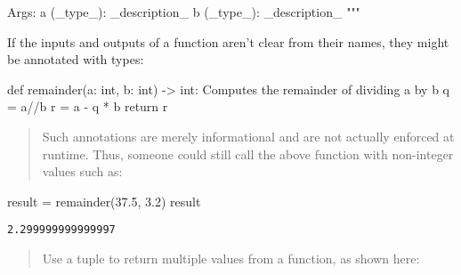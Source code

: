 \documentclass[
  letterpaper,
  DIV=11,
  numbers=noendperiod]{scrreprt}
\newenvironment{Shaded}{\begin{snugshade}}{\end{snugshade}}
\newcommand{\BuiltInTok}[1]{\textcolor[rgb]{0.00,0.46,0.62}{#1}}
\newcommand{\BuiltInTok}[1]{\textcolor[rgb]{0.00,0.48,0.65}{#1}}
\newcommand{\CommentTok}[1]{\textcolor[rgb]{0.37,0.37,0.37}{#1}}
\newcommand{\ControlFlowTok}[1]{\textcolor[rgb]{0.00,0.46,0.62}{#1}}
\newcommand{\ControlFlowTok}[1]{\textcolor[rgb]{0.00,0.48,0.65}{#1}}
\newcommand{\FloatTok}[1]{\textcolor[rgb]{0.68,0.00,0.00}{#1}}
\newcommand{\KeywordTok}[1]{\textcolor[rgb]{0.00,0.46,0.62}{#1}}
\newcommand{\NormalTok}[1]{\textcolor[rgb]{0.00,0.46,0.62}{#1}}
\newcommand{\OperatorTok}[1]{\textcolor[rgb]{0.37,0.37,0.37}{#1}}
\newcommand{\FloatTok}[1]{\textcolor[rgb]{0.68,0.00,0.00}{#1}}
\newcommand{\KeywordTok}[1]{\textcolor[rgb]{0.00,0.48,0.65}{#1}}
\newcommand{\NormalTok}[1]{\textcolor[rgb]{0.00,0.48,0.65}{#1}}
\newcommand{\OperatorTok}[1]{\textcolor[rgb]{0.37,0.37,0.37}{#1}}
\begin{document}
\begin{Shaded}
\begin{Highlighting}[]
\begin{Shaded}
\begin{Highlighting}[]
\CommentTok{    Args:}
\CommentTok{        a (\_type\_): \_description\_}
\CommentTok{        b (\_type\_): \_description\_}
\CommentTok{    """}
\end{Highlighting}
\end{Shaded}

If the inputs and outputs of a function aren't clear from their names,
they might be annotated with types:

\begin{Shaded}
\begin{Highlighting}[]
\KeywordTok{def}\NormalTok{ remainder(a: }\BuiltInTok{int}\NormalTok{, b: }\BuiltInTok{int}\NormalTok{) }\OperatorTok{{-}\textgreater{}} \BuiltInTok{int}\NormalTok{:}
    \CommentTok{\textquotesingle{}\textquotesingle{}\textquotesingle{}  }
\CommentTok{    Computes    the remainder   of  dividing    a   by  b               }
\CommentTok{    \textquotesingle{}\textquotesingle{}\textquotesingle{}}                 
\NormalTok{    q   }\OperatorTok{=}\NormalTok{   a}\OperatorTok{//}\NormalTok{b}
\NormalTok{    r   }\OperatorTok{=}\NormalTok{   a }\OperatorTok{{-}}\NormalTok{ q }\OperatorTok{*}\NormalTok{ b }
    \ControlFlowTok{return}\NormalTok{  r}
\end{Highlighting}
\end{Shaded}

\begin{quote}
Such annotations are merely informational and are not actually enforced
at runtime. Thus, someone could still call the above function with
non-integer values such as:
\end{quote}

\begin{Shaded}
\begin{Highlighting}[]
\NormalTok{result  }\OperatorTok{=}\NormalTok{ remainder(}\FloatTok{37.5}\NormalTok{,   }\FloatTok{3.2}\NormalTok{)}
\NormalTok{result}
\end{Highlighting}
\end{Shaded}

\begin{verbatim}
2.299999999999997
\end{verbatim}

\begin{quote}
Use a tuple to return multiple values from a function, as shown here:
\end{quote}


\end{Highlighting}
\end{Shaded}
\end{document}
